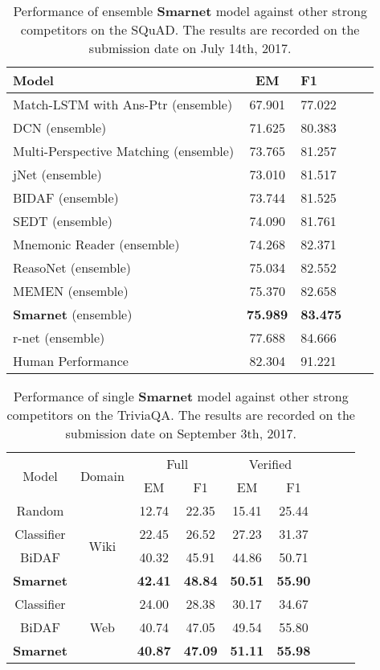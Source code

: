 \documentclass[letterpaper]{article} \usepackage{aaai18}  \usepackage{times}  \usepackage{helvet}  \usepackage{courier}  \usepackage{url}  \usepackage{graphicx}  \usepackage{booktabs}
\begin{document}
 \begin{table}[!t]
	\centering
	\begin{tabular}{lclcl}
		\toprule
		Model & EM &F1 \\
		\midrule
		Match-LSTM with Ans-Ptr (ensemble) &67.901 &77.022 \\
		DCN (ensemble) &71.625 &80.383 \\
		Multi-Perspective Matching (ensemble) &73.765 &81.257 \\
		jNet (ensemble) &73.010 &81.517 \\
	    BIDAF (ensemble) &73.744 &81.525 \\
		SEDT (ensemble) &74.090 &81.761 \\
		Mnemonic Reader (ensemble) &74.268 &82.371 \\
		ReasoNet (ensemble) &75.034 &82.552 \\
		MEMEN (ensemble) &75.370 &82.658 \\
		\textbf{Smarnet} (ensemble) &\textbf{75.989} &\textbf{83.475} \\
		r-net (ensemble) &77.688 &84.666\\
		\midrule
		Human Performance &82.304        &91.221  \\
		\bottomrule	
	\end{tabular}
\caption{Performance of ensemble \textbf{Smarnet} model against other strong competitors on the SQuAD. The results are recorded on the submission date on July 14th, 2017.}
\end{table}
\begin{table}[!t]
\centering
\begin{tabular}{c|c|c|c|c|clcl}
	\hline
	\multirow{2}{*}{Model} &\multirow{2}{*}{Domain} & \multicolumn{2}{|c|}{Full} & \multicolumn{2}{|c}{Verified} \\
	\cline{3-6}
	&& EM & F1  & EM & F1 \\
	\hline
	Random &\multirow{4}{*}{Wiki}& 12.74& 22.35 & 15.41 & 25.44 \\
	Classifier && 22.45 & 26.52 & 27.23 & 31.37 \\
	BiDAF && 40.32 & 45.91 & 44.86 & 50.71 \\
	\textbf{Smarnet} && \textbf{42.41} & \textbf{48.84} & \textbf{50.51} & \textbf{55.90} \\
	\hline
	Classifier &\multirow{3}{*}{Web}& 24.00 & 28.38 & 30.17 & 34.67 \\
	BiDAF && 40.74 & 47.05 & 49.54 & 55.80 \\
	\textbf{Smarnet} && \textbf{40.87} & \textbf{47.09} & \textbf{51.11} & \textbf{55.98} \\
	\hline
\end{tabular}
\caption{Performance of single \textbf{Smarnet} model against other strong competitors on the TriviaQA. The results are recorded on the submission date on September 3th, 2017.}
\end{table}
\end{document}
